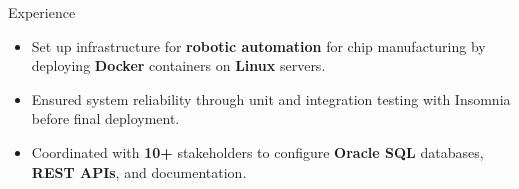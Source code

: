 \documentclass{resume} %
\begin{document}
\begin{workSection}{Experience}
	
	\experienceItem[
	company=Capital One,
	location=McLean{,} VA,
	position=Incoming Software Engineering Intern,
	duration= June 2025 - August 2025,
	]
	
	
	\experienceItem[
	company=Texas Instruments,
	location=Dallas{,} TX,
	position=Information Technology Intern,
	duration= May 2024 - August 2024,
	]
	\begin{itemize}
		\vspace{-0.5em}
		\itemsep -6pt {}
		\item Set up infrastructure for \textbf{robotic automation} for chip manufacturing by deploying \textbf{Docker} containers on \textbf{Linux} servers.
		\item Ensured system reliability through unit and integration testing with Insomnia before final deployment.
		\item Coordinated with \textbf{10+} stakeholders to configure \textbf{Oracle SQL} databases, \textbf{REST APIs}, and documentation.
	\end{itemize}
	

\end{workSection}
\end{document}
